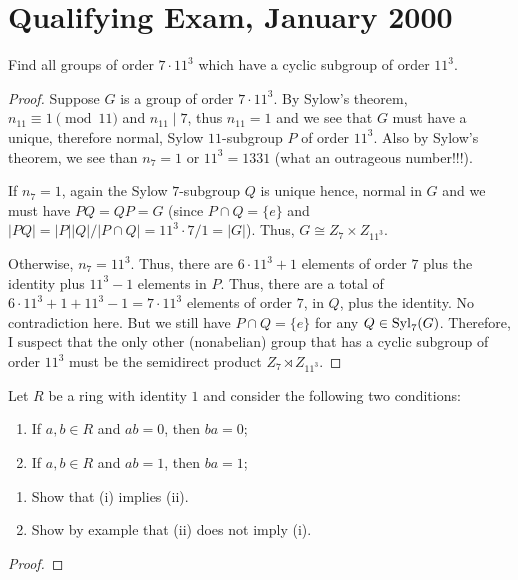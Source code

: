 \chapter{Qualifying Exam, January 2000}
\begin{problem}
Find all groups of order $7\cdot 11^3$ which have a cyclic subgroup of
order $11^3$.
\end{problem}
\begin{proof}
Suppose $G$ is a group of order $7\cdot 11^3$. By Sylow's theorem,
$n_{11}\equiv 1\pmod{11}$ and $n_{11}\mid 7$, thus $n_{11}=1$ and we see
that $G$ must have a unique, therefore normal, Sylow $11$-subgroup $P$ of
order $11^3$. Also by Sylow's theorem, we see than $n_7=1$ or $11^3=1331$
(what an outrageous number!!!).

If $n_7=1$, again the Sylow $7$-subgroup $Q$ is unique hence, normal in $G$
and we must have $PQ=QP=G$ (since $P\cap Q=\{e\}$ and
$|PQ|=|P||Q|/|P\cap Q|=11^3\cdot 7/1=|G|$). Thus,
$G\cong Z_7\times Z_{11^3}$.

Otherwise, $n_7=11^3$. Thus, there are $6\cdot 11^3+1$ elements of order
$7$ plus the identity plus $11^3-1$ elements in $P$. Thus, there are a
total of $6\cdot 11^3+1+11^3-1=7\cdot 11^3$ elements of order $7$, in $Q$,
plus the identity. No contradiction here. But we still have $P\cap Q=\{e\}$
for any $Q\in\operatorname{Syl}_7(G)$. Therefore, I suspect that the only other
(nonabelian) group that has a cyclic subgroup of order $11^3$ must be the
semidirect product $Z_7\rtimes Z_{11^3}$.
\end{proof}

\begin{problem}
Let $R$ be a ring with identity $1$ and consider the following two
conditions:
\begin{center}
\begin{enumerate}[label=(\roman*)]
\item If $a,b\in R$ and $ab=0$, then $ba=0$;
\item If $a,b\in R$ and $ab=1$, then $ba=1$;
\end{enumerate}
\end{center}
\begin{enumerate}[label=(\alph*)]
\item Show that (i) implies (ii).
\item Show by example that (ii) does not imply (i).
\end{enumerate}
\end{problem}
\begin{proof}
\end{proof}

